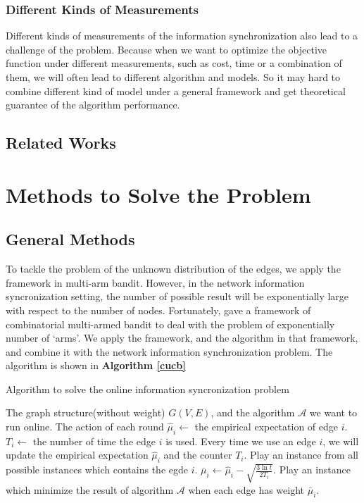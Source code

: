 \documentclass{article}
\theoremstyle{plain}
\theoremstyle{definition}
\theoremstyle{remark}
\begin{document}
    \subsubsection{Different Kinds of Measurements}
    Different kinds of measurements of the information synchronization also lead to a challenge of the problem. Because when we want to optimize the objective function under different measurements, such as cost, time or a combination of them, we will often lead to different algorithm and models. So it may hard to combine different kind of model under a general framework and get theoretical guarantee of the algorithm performance.

    \subsection{Related Works}

    \section{Methods to Solve the Problem}
    \subsection{General Methods}
    To tackle the problem of the unknown distribution of the edges, we apply the framework in multi-arm bandit. However, in the network information syncronization setting, the number of possible result will be exponentially large with respect to the number of nodes. Fortunately, \cite{chen2013combinatorial} gave a framework of combinatorial multi-armed bandit to deal with the problem of exponentially number of `arms'. We apply the framework, and the algorithm in that framework, and combine it with the network information synchronization problem. The algorithm is shown in \textbf{Algorithm \ref{cucb}}

    \begin{algorithm}
        \caption{Algorithm to solve the online information syncronization problem}
        \label{cucb}
        \begin{algorithmic}[1]
        \Require The graph structure(without weight) $G(V,E)$, and the algorithm $\mathcal A$ we want to run online.
        \Ensure The action of each round
            \State $\hat \mu_i \leftarrow$ the empirical expectation of edge $i$.
            \State $T_i \leftarrow$ the number of time the edge $i$ is used.
            \State Every time we use an edge $i$, we will update the empirical expectation $\hat \mu_i$ and the counter $T_i$.
                \State Play an instance from all possible instances which contains the egde $i$.
            \EndFor
                \State $\bar\mu_i \leftarrow \hat\mu_i - \sqrt{\frac{3\ln t}{2T_i}}$.
                \State Play an instance which minimize the result of algorithm $\mathcal A$ when each edge has weight $\bar\mu_i$.
            \EndFor
        \EndProcedure
        \end{algorithmic}
    \end{algorithm}
\end{document}
